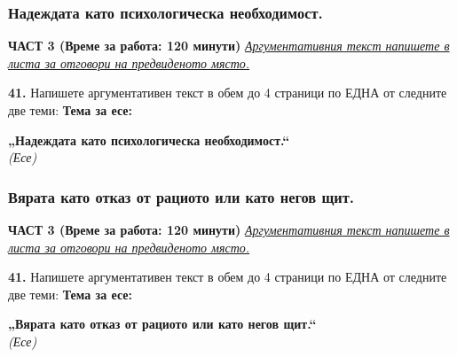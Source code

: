 \documentclass[12pt,a4paper]{article}
\begin{document}
\subsubsection{Надеждата като психологическа необходимост.}
\vspace{0.5cm}
\begin{center}
\textbf{ЧАСТ 3 (Време за работа: 120 минути)}
\vspace{0.2cm}
{\textit{\underline{Аргументативния текст напишете в листа за отговори на предвиденото място.}}}
\vspace{0.1cm}
\end{center}
\textbf{41.} Напишете аргументативен текст в обем до 4 страници по ЕДНА от следните две теми:
\vspace{0.2cm}
\textbf{Тема за есе:}
\vspace{0.1cm}
\begin{center}
\textbf{„Надеждата като психологическа необходимост.“}
\\
\textit{(Есе)}
\end{center}

\subsubsection{Вярата като отказ от рациото или като негов щит.}
\vspace{0.5cm}
\begin{center}
\textbf{ЧАСТ 3 (Време за работа: 120 минути)}
\vspace{0.2cm}
{\textit{\underline{Аргументативния текст напишете в листа за отговори на предвиденото място.}}}
\vspace{0.1cm}
\end{center}
\textbf{41.} Напишете аргументативен текст в обем до 4 страници по ЕДНА от следните две теми:
\vspace{0.2cm}
\textbf{Тема за есе:}
\vspace{0.1cm}
\begin{center}
\textbf{„Вярата като отказ от рациото или като негов щит.“}
\\
\textit{(Есе)}
\end{center}
\end{document}
